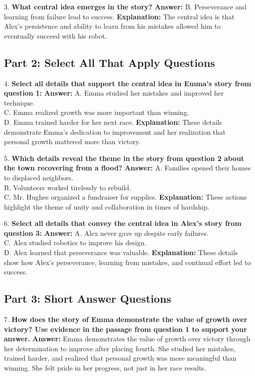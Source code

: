 \documentclass[12pt]{article}
\begin{document}
\vspace{1cm}
3. \textbf{What central idea emerges in the story?}  
\textbf{Answer:} B. Perseverance and learning from failure lead to success.  
\textbf{Explanation:} The central idea is that Alex’s persistence and ability to learn from his mistakes allowed him to eventually succeed with his robot.

\subsection*{Part 2: Select All That Apply Questions}

4. \textbf{Select all details that support the central idea in Emma’s story from question 1:}  
\textbf{Answer:} A. Emma studied her mistakes and improved her technique. \\
C. Emma realized growth was more important than winning. \\
D. Emma trained harder for her next race.  
\textbf{Explanation:} These details demonstrate Emma’s dedication to improvement and her realization that personal growth mattered more than victory.

\vspace{1cm}
5. \textbf{Which details reveal the theme in the story from question 2 about the town recovering from a flood?}  
\textbf{Answer:} A. Families opened their homes to displaced neighbors. \\
B. Volunteers worked tirelessly to rebuild. \\
C. Mr. Hughes organized a fundraiser for supplies.  
\textbf{Explanation:} These actions highlight the theme of unity and collaboration in times of hardship.

\vspace{1cm}
6. \textbf{Select all details that convey the central idea in Alex’s story from question 3:}  
\textbf{Answer:} A. Alex never gave up despite early failures. \\
C. Alex studied robotics to improve his design. \\
D. Alex learned that perseverance was valuable.  
\textbf{Explanation:} These details show how Alex's perseverance, learning from mistakes, and continual effort led to success.

\subsection*{Part 3: Short Answer Questions}

7. \textbf{How does the story of Emma demonstrate the value of growth over victory? Use evidence in the passage from question 1 to support your answer.}  
\textbf{Answer:} Emma demonstrates the value of growth over victory through her determination to improve after placing fourth. She studied her mistakes, trained harder, and realized that personal growth was more meaningful than winning. She felt pride in her progress, not just in her race results.
\end{document}
